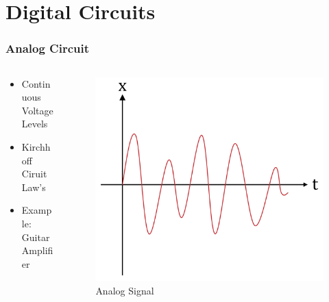 \documentclass{beamer}
\begin{document}
\section{Digital Circuits}
\begin{frame}\frametitle{Analog Circuit}
  \begin{columns}
  \begin{column}{6cm}
  \begin{itemize}
   \item Continuous Voltage Levels
   \item Kirchhoff Ciruit Law's
   \item Example: Guitar Amplifier

  \end{itemize}


  \end{column}
  \begin{column}{6cm}
  \begin{figure}
  \includegraphics[width=1\textwidth]{analog}
  \caption{Analog Signal}
  \end{figure}
  \end{column}
  \end{columns}
\end{frame}
\end{document}
